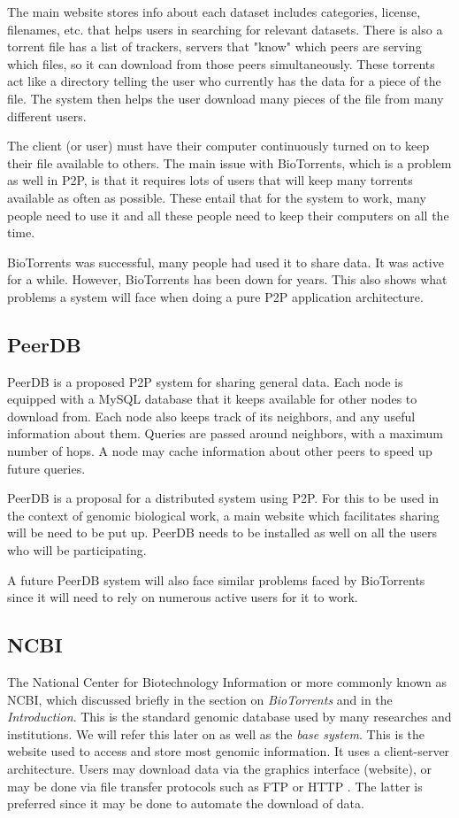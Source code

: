 \documentclass[acmsmall]{acmart}
\begin{document}
The main website stores info about each dataset includes categories, license, filenames, etc. that helps users in searching for relevant datasets. There is also a torrent file has a list of trackers, servers that "know" which peers are serving which files, so it can download from those peers simultaneously. These torrents act like a directory telling the user who currently has the data for a piece of the file. The system then helps the user download many pieces of the file from many different users.

The client (or user) must have their computer continuously turned on to keep their file available to others. The main issue with BioTorrents, which is a problem as well in P2P, is that it requires lots of users that will keep many torrents available as often as possible.\cite{biotorrents} These entail that for the system to work, many people need to use it and all these people need to keep their computers on all the time.

BioTorrents was successful, many people had used it to share data. It was active for a while. However, BioTorrents has been down for years. This also shows what problems a system will face when doing a pure P2P application architecture.

\subsection{PeerDB}
PeerDB is a proposed P2P system for sharing general data. Each node is equipped with a MySQL database that it keeps available for other nodes to download from. Each node also keeps track of its neighbors, and any useful information about them. Queries are passed around neighbors, with a maximum number of hops. A node may cache information about other peers to speed up future queries.
\cite{peerdb}

PeerDB is a proposal for a distributed system using P2P. For this to be used in the context of genomic biological work, a main website which facilitates sharing will be need to be put up. PeerDB needs to be installed as well on all the users who will be participating.

A future PeerDB system will also face similar problems faced by BioTorrents since it will need to rely on numerous active users for it to work.

\subsection{NCBI}
The National Center for Biotechnology Information or more commonly known as NCBI, which discussed briefly in the section on \textit{BioTorrents} and in the \textit{Introduction}. This is the standard genomic database used by many researches and institutions. We will refer this later on as well as the \textit{base system}. This is the website used to access and store most genomic information\cite{campbell}. It uses a client-server architecture. Users may download data via the graphics interface (website), or may be done via file transfer protocols such as FTP or HTTP \cite{biotorrents}. The latter is preferred since it may be done to automate the download of data.
\end{document}

